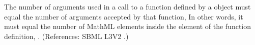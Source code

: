 The number of arguments used in a call to a function defined by a
\FunctionDefinition object must equal the number of arguments accepted by
that function,   In other words, it must equal the number of MathML
 elements inside the  element of the function
definition, .  (References: SBML L3V2
.)
